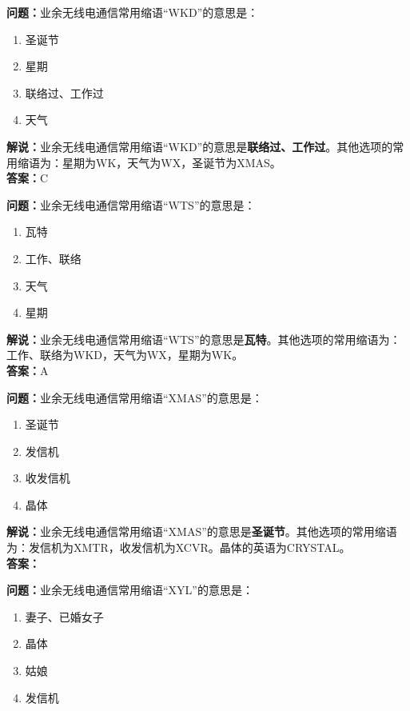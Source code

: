 \bigskip


\noindent\textbf{问题：}业余无线电通信常用缩语“WKD”的意思是：
\begin{enumerate}[label=\Alph*), leftmargin=3em]
\item 圣诞节
\item 星期
\item 联络过、工作过
\item 天气
\end{enumerate}
\noindent\textbf{解说：}业余无线电通信常用缩语“WKD”的意思是\textbf{联络过、工作过}。其他选项的常用缩语为：星期为WK，天气为WX，圣诞节为XMAS。\\\noindent\textbf{答案：}C



\bigskip


\noindent\textbf{问题：}业余无线电通信常用缩语“WTS”的意思是：
\begin{enumerate}[label=\Alph*), leftmargin=3em]
\item 瓦特
\item 工作、联络
\item 天气
\item 星期
\end{enumerate}
\noindent\textbf{解说：}业余无线电通信常用缩语“WTS”的意思是\textbf{瓦特}。其他选项的常用缩语为：工作、联络为WKD，天气为WX，星期为WK。\\\noindent\textbf{答案：}A


\bigskip


\noindent\textbf{问题：}业余无线电通信常用缩语“XMAS”的意思是：
\begin{enumerate}[label=\Alph*), leftmargin=3em]
\item 圣诞节
\item 发信机
\item 收发信机
\item 晶体
\end{enumerate}
\noindent\textbf{解说：}业余无线电通信常用缩语“XMAS”的意思是\textbf{圣诞节}。其他选项的常用缩语为：发信机为XMTR，收发信机为XCVR。晶体的英语为CRYSTAL。\\\noindent\textbf{答案：}



\bigskip


\noindent\textbf{问题：}业余无线电通信常用缩语“XYL”的意思是：
\begin{enumerate}[label=\Alph*), leftmargin=3em]
\item 妻子、已婚女子
\item 晶体
\item 姑娘
\item 发信机
\end{enumerate}

